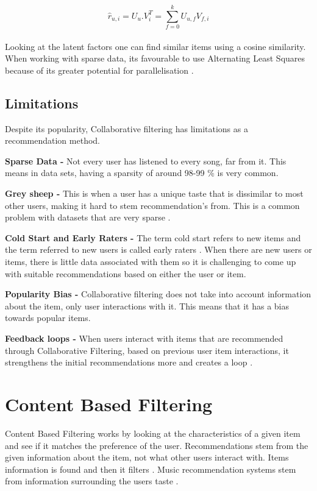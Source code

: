 \begin{equation}
	\hat{r} _{u,i} = U _{u} . V _{i}^{T} = \sum_{f=0}^{k} U_{u,f} V_{f, i}
\end{equation}
\\
Looking at the latent factors one can find  similar items using a cosine similarity. When working with sparse data, its favourable to use Alternating Least Squares because of its greater potential for parallelisation \citep{koren_matrix_2009}.

\subsection{Limitations}
Despite its popularity, Collaborative filtering has limitations as a recommendation method.

\textbf{Sparse Data - }Not every user has listened to every song, far from it. This means in data sets, having a sparsity of around 98-99 \% is very common.

\textbf{Grey sheep - }This is when a user has a unique taste that is dissimilar to most other users, making it hard to stem recommendation's from. This is a common problem with datasets that are very sparse \citep{claypool_combining_1999}.

\textbf{Cold Start and Early Raters - } The term cold start refers to new items and the term referred to new users is called early raters \citep{avery_recommender_1997}. When there are new users or items, there is little data associated with them so it is challenging to come up with suitable recommendations based on either the user or item. 

\textbf{Popularity Bias - } Collaborative filtering does not take into account information about the item, only user interactions with it. This means that it has a bias towards popular items.

\textbf{Feedback loops - } When users interact with items that are recommended through Collaborative Filtering, based on previous user item interactions, it strengthens the initial recommendations more and creates a loop \citep{sanchez-moreno_incorporating_2018}.

\section{Content Based Filtering}

Content Based Filtering works by looking at the characteristics of a given item and see if it matches the preference of the user. Recommendations stem from the given information about the item, not what other users interact with. Items information is found and then it filters \citep{casey_content-based_2008}. Music recommendation systems stem from information surrounding the users taste \citep{aucouturier_music_2002} \citep{logan_music_2004}. 

